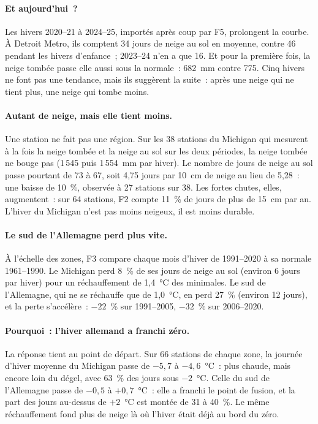 \paragraph{Et aujourd'hui~?}
Les hivers 2020--21 à 2024--25, importés après coup par F5, prolongent la courbe. À Detroit Metro, ils comptent 34 jours de neige au sol en moyenne, contre 46 pendant les hivers d'enfance~; 2023--24 n'en a que 16. Et pour la première fois, la neige tombée passe elle aussi sous la normale~: 682~mm contre 775. Cinq hivers ne font pas une tendance, mais ils suggèrent la suite~: après une neige qui ne tient plus, une neige qui tombe moins.

\paragraph{Autant de neige, mais elle tient moins.}
Une station ne fait pas une région. Sur les 38 stations du Michigan qui mesurent à la fois la neige tombée et la neige au sol sur les deux périodes, la neige tombée ne bouge pas (1\,545 puis 1\,554~mm par hiver). Le nombre de jours de neige au sol passe pourtant de 73 à 67, soit 4,75 jours par 10~cm de neige au lieu de 5,28~: une baisse de 10~\%, observée à 27 stations sur 38. Les fortes chutes, elles, augmentent~: sur 64 stations, F2 compte 11~\% de jours de plus de 15~cm par an. L'hiver du Michigan n'est pas moins neigeux, il est moins durable.

\paragraph{Le sud de l'Allemagne perd plus vite.}
À l'échelle des zones, F3 compare chaque mois d'hiver de 1991--2020 à sa normale 1961--1990. Le Michigan perd 8~\% de ses jours de neige au sol (environ 6 jours par hiver) pour un réchauffement de 1,4~°C des minimales. Le sud de l'Allemagne, qui ne se réchauffe que de 1,0~°C, en perd 27~\% (environ 12 jours), et la perte s'accélère~: $-22$~\% sur 1991--2005, $-32$~\% sur 2006--2020.

\paragraph{Pourquoi~: l'hiver allemand a franchi zéro.}
La réponse tient au point de départ. Sur 66 stations de chaque zone, la journée d'hiver moyenne du Michigan passe de $-5,7$ à $-4,6$~°C~: plus chaude, mais encore loin du dégel, avec 63~\% des jours sous $-2$~°C. Celle du sud de l'Allemagne passe de $-0,5$ à $+0,7$~°C~: elle a franchi le point de fusion, et la part des jours au-dessus de $+2$~°C est montée de 31 à 40~\%. Le même réchauffement fond plus de neige là où l'hiver était déjà au bord du zéro.

